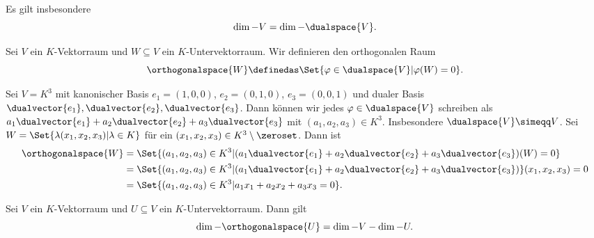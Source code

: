 \begin{bemerkung*}
  Es gilt insbesondere
  \begin{equation*}
    \dim-{V}=\dim-{\dualspace{V}}.
  \end{equation*}
\end{bemerkung*}
\begin{definition*}
  Sei \( V \) ein \( K \)-Vektorraum und \( W\subseteq V \) ein \( K \)-Untervektorraum. Wir definieren den orthogonalen Raum
  \begin{equation*}
    \orthogonalspace{W}\definedas \Set{\varphi\in \dualspace{V}|\varphi(W)=0}.
  \end{equation*}
\end{definition*}
\begin{beispiel*}
  Sei \( V=K^3 \) mit kanonischer Basis \( e_1=(1,0,0) \), \( e_2=(0,1,0) \), \( e_3=(0,0,1) \) und dualer Basis \( \dualvector{e_1}, \dualvector{e_2},\dualvector{e_3} \). Dann können wir jedes \( \varphi\in \dualspace{V} \) schreiben als \( a_1 \dualvector{e_1}+a_2\dualvector{e_2}+a_3\dualvector{e_3} \) mit \( (a_1,a_2,a_3)\in K^3 \). Insbesondere \( \dualspace{V}\simeqq V \). Sei \( W=\Set{\lambda(x_1,x_2,x_3)|\lambda\in K} \) für ein \( (x_1,x_2,x_3)\in K^3\setminus \zeroset \). Dann ist
  \begin{align*}
    \orthogonalspace{W}&=\Set{(a_1,a_2,a_3)\in K^3|(a_1\dualvector{e_1}+a_2\dualvector{e_2}+a_3\dualvector{e_3})(W)=0}\\
    &=\Set{(a_1,a_2,a_3)\in K^3|(a_1\dualvector{e_1}+a_2\dualvector{e_2}+a_3\dualvector{e_3})}(x_1,x_2,x_3)=0\\
    &=\Set{(a_1,a_2,a_3)\in K^3|a_1x_1+a_2x_2+a_3x_3=0}.
  \end{align*}
\end{beispiel*}
\begin{lemma}
  Sei \( V \) ein \( K \)-Vektorraum und \( U\subseteq V \) ein \( K \)-Untervektorraum. Dann gilt
  \begin{equation*}
    \dim-{\orthogonalspace{U}}=\dim-{V}-\dim-{U}.
  \end{equation*}
\end{lemma}
